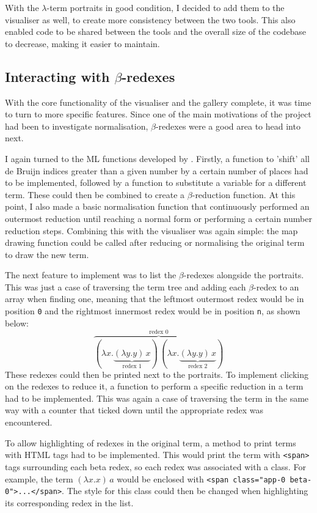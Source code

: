 \documentclass[11pt]{article}
\begin{document}
With the $\lambda$-term portraits in good condition, I decided to add them to the visualiser as well, to create more consistency between the two tools. This also enabled code to be shared between the tools and the overall size of the codebase to decrease, making it easier to maintain.

\subsection{Interacting with \texorpdfstring{$\beta$}{beta}-redexes}
With the core functionality of the visualiser and the gallery complete, it was time to turn to more specific features. Since one of the main motivations of the project had been to investigate normalisation, $\beta$-redexes were a good area to head into next.

I again turned to the \textsc{ML} functions developed by \cite{pierce}. Firstly, a function to 'shift' all de Bruijn indices greater than a given number by a certain number of places had to be implemented, followed by a function to substitute a variable for a different term. These could then be combined to create a $\beta$-reduction function. At this point, I also made a basic normalisation function that continuously performed an outermost reduction until reaching a normal form or performing a certain number reduction steps. Combining this with the visualiser was again simple: the map drawing function could be called after reducing or normalising the original term to draw the new term.

The next feature to implement was to list the $\beta$-redexes alongside the portraits. This was just a case of traversing the term tree and adding each $\beta$-redex to an array when finding one, meaning that the leftmost outermost redex would be in position \texttt{0} and the rightmost innermost redex would be in position \texttt{n}, as shown below:
%
$$ \overbrace{(\lambda x. \underbrace{(\lambda y. y) \, x}_\text{redex 1}) \, (\lambda x. \underbrace{(\lambda y. y) \, x}_\text{redex 2})}^\text{redex 0} $$
%
These redexes could then be printed next to the portraits. To implement clicking on the redexes to reduce it, a function to perform a specific reduction in a term had to be implemented. This was again a case of traversing the term in the same way with a counter that ticked down until the appropriate redex was encountered.

To allow highlighting of redexes in the original term, a method to print terms with HTML tags had to be implemented. This would print the term with \texttt{<span>} tags surrounding each beta redex, so each redex was associated with a class. For example, the term $(\lambda x. x) \, a$ would be enclosed with \texttt{<span class="app-0 beta-0">...</span>}. The style for this class could then be changed when highlighting its corresponding redex in the list. 
\end{document}
